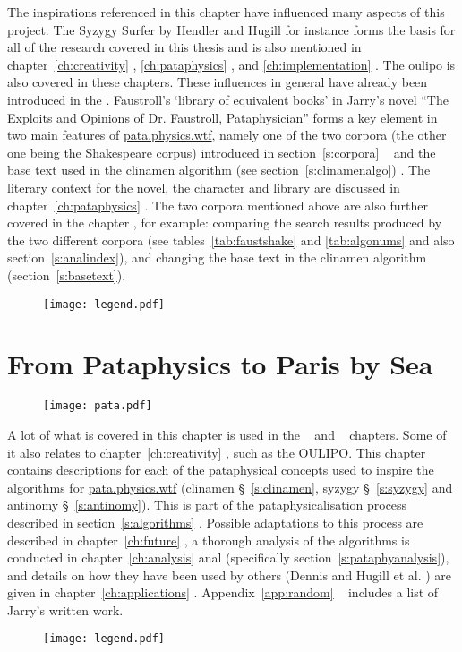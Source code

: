 \documentclass[11pt]{thesis} %
\begin{document}
\vfill

{\sffamily 

The inspirations referenced in this chapter have influenced many aspects of this project. The Syzygy Surfer by Hendler and Hugill \autocite*{Hendler2011, Hendler2013} for instance forms the basis for all of the research covered in this thesis and is also mentioned in chapter~\ref{ch:creativity} \creat, \ref{ch:pataphysics} \pata, and \ref{ch:implementation} \imple. The \ac{oulipo} is also covered in these chapters. These influences in general have already been introduced in the  \intro. Faustroll's `library of equivalent books' in Jarry's novel ``The Exploits and Opinions of Dr. Faustroll, Pataphysician'' \autocite*{Jarry1996} forms a key element in two main features of \url{pata.physics.wtf}, namely one of the two corpora (the other one being the Shakespeare corpus) introduced in section~\ref{s:corpora} \imple~ and the base text used in the clinamen algorithm (see section~\ref{s:clinamenalgo}) \imple. The literary context for the novel, the character and library are discussed in chapter~\ref{ch:pataphysics} \pata. The two corpora mentioned above are also further covered in the  chapter \anal, for example: comparing the search results produced by the two different corpora (see tables~\ref{tab:faustshake} and \ref{tab:algonums} and also section~\ref{s:analindex}), and changing the base text in the clinamen algorithm (section~\ref{s:basetext}).
}

\begin{figure}[!htbp]
\centering
  \texttt{[image: legend.pdf]}
\end{figure}


\newpage

\section{From Pataphysics to Paris by Sea}

\begin{figure}[!htb]
\centering
  \texttt{[image: pata.pdf]}
\end{figure}

{\sffamily 
A lot of what is covered in this chapter is used in the  \imple~ and  \inspi~ chapters. Some of it also relates to chapter~\ref{ch:creativity} \creat, such as the \ac{OULIPO}. This chapter contains descriptions for each of the pataphysical concepts used to inspire the algorithms for \url{pata.physics.wtf} (clinamen §~\ref{s:clinamen}, syzygy §~\ref{s:syzygy} and antinomy §~\ref{s:antinomy}). This is part of the pataphysicalisation process described in section~\ref{s:algorithms} \imple. Possible adaptations to this process are described in chapter~\ref{ch:future} \aspi, a thorough analysis of the algorithms is conducted in chapter~\ref{ch:analysis} anal (specifically section~\ref{s:pataphyanalysis}), and details on how they have been used by others (Dennis \autocite*{Dennis2016} and Hugill et al. \autocite*{Hugill2014a}) are given in chapter~\ref{ch:applications} \appli. Appendix~\ref{app:random} \appa~ includes a list of Jarry's written work. 
}

\begin{figure}[!htb]
\centering
  \texttt{[image: legend.pdf]}
\end{figure}

\stopcontents[chapters]
\end{document}
